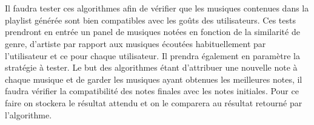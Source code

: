 \documentclass[12pt, openany]{report}
\begin{document}
\begin{itemize}
\\
\\
Il faudra tester ces algorithmes afin de vérifier que les musiques contenues dans la playlist générée sont bien compatibles avec les goûts des utilisateurs. Ces tests prendront en entrée un panel de musiques notées en fonction de la similarité de genre, d'artiste par rapport aux musiques écoutées habituellement par l'utilisateur et ce pour chaque utilisateur. Il prendra également en paramètre la stratégie à tester. Le but des algorithmes étant d'attribuer une nouvelle note à chaque musique et de garder les musiques ayant obtenues les meilleures notes, il faudra vérifier la compatibilité des notes finales avec les notes initiales. Pour ce faire on stockera le résultat attendu et on le comparera au résultat retourné par l'algorithme.
\\
\\


\end{itemize}
\end{document}

